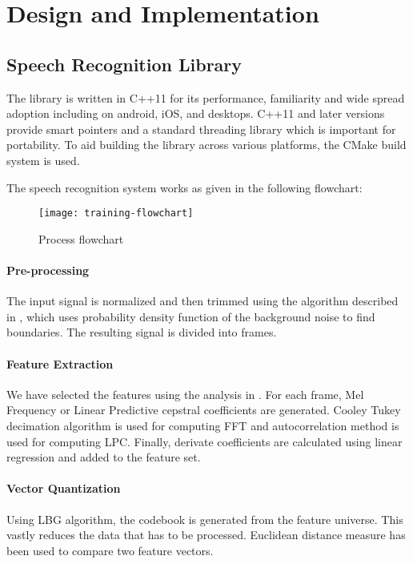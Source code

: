 \chapter{Design and Implementation} \label{ch:proposal}

\section{Speech Recognition Library}

The library is written in C++11 for its performance, familiarity and wide spread adoption including on android, iOS, and desktops. 
C++11 and later versions provide smart pointers and a standard threading library which is important for portability. To aid building the library across various platforms, the CMake build system is used.

The speech recognition system works as given in the following flowchart:

\begin{figure}[h!]
    \centering
    \texttt{[image: training-flowchart]}
    \label{fig:training-flowchart}
    \caption{Process flowchart}
\end{figure}

\subsubsection{Pre-processing}
The input signal is normalized and then trimmed using the algorithm described in \cite{Saha_anew}, which uses probability density function of the background noise to find boundaries. The resulting signal is divided into frames.

\subsubsection{Feature Extraction}
We have selected the features using the analysis in \cite{divya}. For each frame, Mel Frequency or Linear Predictive cepstral coefficients are generated. Cooley Tukey decimation algorithm is used for computing FFT and autocorrelation method is used for computing LPC. Finally, derivate coefficients are calculated using linear regression and added to the feature set.

\subsubsection{Vector Quantization}
Using LBG algorithm, the codebook is generated from the feature universe. This vastly reduces the data that has to be processed. Euclidean distance measure has been used to compare two feature vectors.

